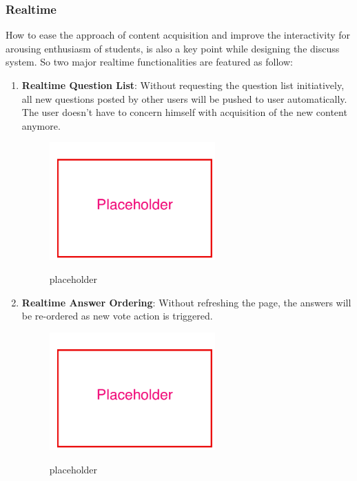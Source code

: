 \subsubsection{Realtime}
How to ease the approach of content acquisition and improve the interactivity for arousing enthusiasm of students, is also a key point while designing the discuss system. So two major realtime functionalities are featured as follow: 


\begin{enumerate}
\item
\textbf{Realtime Question List}: Without requesting the question list initiatively, all new questions posted by other users will be pushed to user automatically. The user doesn't have to concern himself with acquisition of the new content anymore.

\begin{figure}[!htbp]
  \caption{placeholder}
  \centering
    \includegraphics[width=0.6\textwidth]{Figures/placeholder.png}
  \label{fig:placeholder}
\end{figure}

\item
\textbf{Realtime Answer Ordering}: Without refreshing the page, the answers will be re-ordered as new vote action is triggered.

\begin{figure}[!htbp]
  \centering
    \includegraphics[width=0.6\textwidth]{Figures/placeholder.png}
  \label{fig:placeholder}
  \caption{placeholder}
\end{figure}


\end{enumerate}
